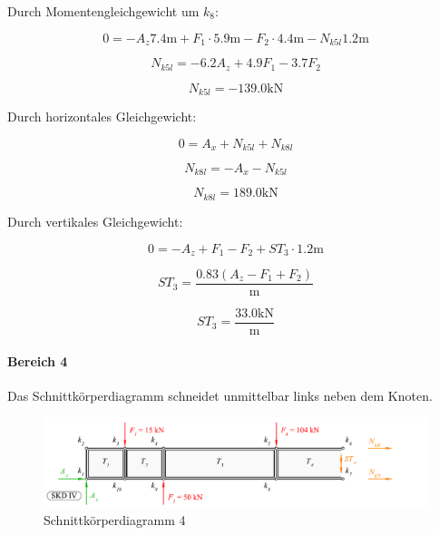 \documentclass[
  12pt,
  letterpaper,
  DIV=11,
  egregdoesnotlikesansseriftitles]{scrartcl}
\let\oldparagraph\paragraph
\renewcommand{\paragraph}[1]{\oldparagraph{#1}\mbox{}}
\begin{document}
Durch Momentengleichgewicht um \(k_{8}\):

\begin{equation}0 = - A_{z} 7.4 \text{m} + F_{1} \cdot 5.9 \text{m} - F_{2} \cdot 4.4 \text{m} - N_{k5l} 1.2 \text{m}\end{equation}

\begin{equation}N_{k5l} = - 6.2 A_{z} + 4.9 F_{1} - 3.7 F_{2}\end{equation}

\begin{equation}N_{k5l} = - 139.0 \text{k} \text{N}\end{equation}

Durch horizontales Gleichgewicht:

\begin{equation}0 = A_{x} + N_{k5l} + N_{k8l}\end{equation}

\begin{equation}N_{k8l} = - A_{x} - N_{k5l}\end{equation}

\begin{equation}N_{k8l} = 189.0 \text{k} \text{N}\end{equation}

Durch vertikales Gleichgewicht:

\begin{equation}0 = - A_{z} + F_{1} - F_{2} + ST_{3} \cdot 1.2 \text{m}\end{equation}

\begin{equation}ST_{3} = \frac{0.83 \left(A_{z} - F_{1} + F_{2}\right)}{\text{m}}\end{equation}

\begin{equation}ST_{3} = \frac{33.0 \text{k} \text{N}}{\text{m}}\end{equation}

\hypertarget{bereich-4}{%
\paragraph{Bereich 4}\label{bereich-4}}

Das Schnittkörperdiagramm schneidet unmittelbar links neben dem Knoten.

\begin{figure}[H]

{\centering \includegraphics{BSI_HS23_Testat_03_files/mediabag/../images/Testat_03_HS23_SKD1.pdf}

}

\caption{\label{fig-skd4}Schnittkörperdiagramm 4}

\end{figure}
\end{document}
